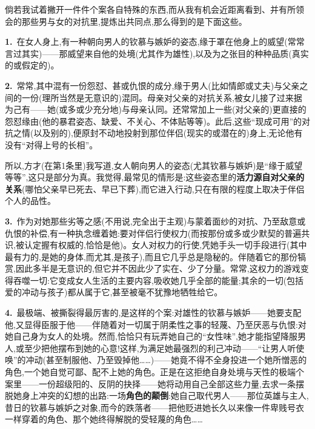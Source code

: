 倘若我试着撇开一件件个案各自特殊的东西,而从我有机会近距离看到、并有所领会的那些男与女的对抗里,提炼出共同点\dmark{},那么得到的是下面这些。

\textbf{1.}~在女人身上,有一种朝向男人的钦慕与嫉妒的姿态,缘于罩在他身上的威望(常常言过其实)——那威望来自他的处境(尤其作为雄性),以及为之张目的种种品质(真实的或假定的)。

\textbf{2.}~常常,其中混有一份怨怼、甚或仇恨的成分,缘于男人(比如情郎或丈夫)与父亲之间的一份(理所当然是无意识的)混同。母亲对父亲的对抗关系,被女儿接了过来据为己有——她(或多或少充分地)与母亲认同。还常常加上一些(对父亲的)更直接的怨怼缘由(他的暴君姿态、缺爱、不关心、不体贴等等)。此后,这些“现成可用”的对抗之情(以及别的),便原封不动地投射到那位伴侣(现实的或潜在的)身上,无论他有没有“对得上号的长相”。

所以,方才(在第1条里)我写道,女人朝向男人的姿态(尤其钦慕与嫉妒)是“缘于威望等等”,这只是部分为真。我觉得,最常见的情形是:这些姿态里的\textbf{活力}\textbf{源自对父亲的关系}(哪怕父亲早已死去、早已下葬),而它进入行动,只在有限的程度上取决于伴侣个人的品性。

\textbf{3.}~作为对她那些劣等之感(不用说,完全出于主观)与蒙着面纱的对抗、乃至敌意或仇恨的补偿,有一种执念缠着她:要对伴侣行使权力(而按那份或多或少默契的普遍共识,被认定握有权威的,恰恰是他)。女人对权力的行使,凭她手头一切手段进行(其中最有力的,是她的身体,而尤其,是孩子),而且它几乎总是隐秘的。伴随着它的那份犒赏,因此多半是无意识的,但它并不因此少了实在、少了分量。常常,这权力的游戏变得吞噬一切:它变成女人生活的主要内容,吸收她几乎全部的能量;其余的一切(包括爱的冲动与孩子)都从属于它,甚至被毫不犹豫地牺牲给它。

\textbf{4.}~\dmark{}最极端、被撕裂得最厉害的,是这样的个案:对雄性的钦慕与嫉妒——她要支配他,又显得臣服于他——伴随着对一切属于阴柔性之事的轻蔑、乃至厌恶与仇恨:对她自己身为女人的处境。然而,恰恰只有玩弄她自己的“女性味”,她才能指望降服男人,或至少把他摆布到她的心意!这样,为满足她最强烈的利己冲动——“让男人听使唤”的冲动(甚至制服他、乃至毁掉他……)——她竟不得不全身投进一个她所憎恶的角色,一个她自觉可鄙、配不上她的角色。正是在这拒绝自身处境与天性的极端个案里——一份超级阳的、反阴的抉择——她将动用自己全部这些力量,去求一条摆脱她身上冲突的幻想的出路:一场\textbf{角色的颠倒}:她自己取代男人——那位英雄与主人,昔日的钦慕与嫉妒之对象,而今的跌落者——把他贬进她长久以来像一件卑贱号衣一样穿着的角色、那个她终得解脱的受轻蔑的角色……


